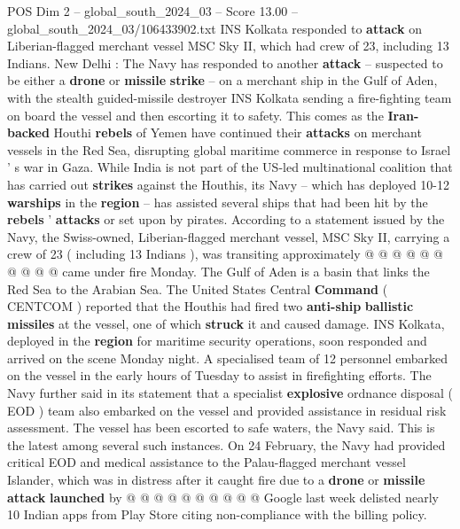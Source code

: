 \begin{textsample}{POS Dim 2 – global\_south\_2024\_03 – Score 13.00 – global\_south\_2024\_03/106433902.txt}  \label{ex:f2_pos_337}
INS Kolkata responded to \textbf{attack} on Liberian-flagged merchant vessel MSC Sky II, which had crew of 23, including 13 Indians.
New Delhi : The Navy has responded to another \textbf{attack} -- suspected to be either a \textbf{drone} or \textbf{missile} \textbf{strike} -- on a merchant ship in the Gulf of Aden, with the stealth guided-missile destroyer INS Kolkata sending a fire-fighting team on board the vessel and then escorting it to safety.
This comes as the \textbf{Iran-backed} Houthi \textbf{rebels} of Yemen have continued their \textbf{attacks} on merchant vessels in the Red Sea, disrupting global maritime commerce in response to Israel ' s war in Gaza.
While India is not part of the US-led multinational coalition that has carried out \textbf{strikes} against the Houthis, its Navy -- which has deployed 10-12 \textbf{warships} in the \textbf{region} -- has assisted several ships that had been hit by the \textbf{rebels} ' \textbf{attacks} or set upon by pirates.
According to a statement issued by the Navy, the Swiss-owned, Liberian-flagged merchant vessel, MSC Sky II, carrying a crew of 23 ( including 13 Indians ), was transiting approximately @ @ @ @ @ @ @ @ @ @ came under fire Monday.
The Gulf of Aden is a basin that links the Red Sea to the Arabian Sea.
The United States Central \textbf{Command} ( CENTCOM ) reported that the Houthis had fired two \textbf{anti-ship} \textbf{ballistic} \textbf{missiles} at the vessel, one of which \textbf{struck} it and caused damage.
INS Kolkata, deployed in the \textbf{region} for maritime security operations, soon responded and arrived on the scene Monday night.
A specialised team of 12 personnel embarked on the vessel in the early hours of Tuesday to assist in firefighting efforts.
The Navy further said in its statement that a specialist \textbf{explosive} ordnance disposal ( EOD ) team also embarked on the vessel and provided assistance in residual risk assessment.
The vessel has been escorted to safe waters, the Navy said.
This is the latest among several such instances.
On 24 February, the Navy had provided critical EOD and medical assistance to the Palau-flagged merchant vessel Islander, which was in distress after it caught fire due to a \textbf{drone} or \textbf{missile} \textbf{attack} \textbf{launched} by @ @ @ @ @ @ @ @ @ @ Google last week delisted nearly 10 Indian apps from Play Store citing non-compliance with the billing policy.

\end{textsample}
